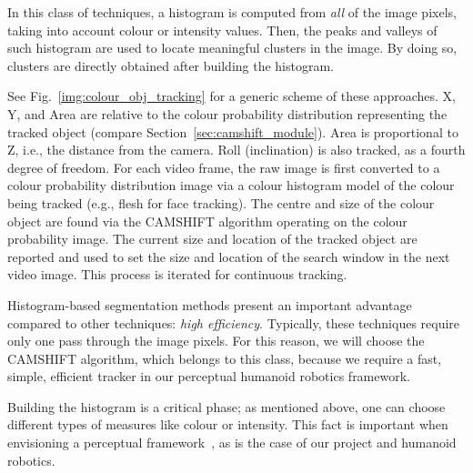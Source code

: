 In this class of techniques, a histogram is computed from \emph{all} of the image pixels, taking into account colour or intensity values. Then, the peaks and valleys of such histogram are used to locate meaningful clusters in the image. By doing so, clusters are directly obtained after building the histogram.

See Fig.~\ref{img:colour_obj_tracking} for a generic scheme of these approaches. X, Y, and Area are relative to the colour probability distribution representing the tracked object (compare Section~\ref{sec:camshift_module}). Area is proportional to Z, i.e., the distance from the camera. Roll (inclination) is also tracked, as a fourth degree of freedom. For each video frame, the raw image is first converted to a colour probability distribution image via a colour histogram model of the colour being tracked (e.g., flesh for face tracking). The centre and size of the colour object are found via the \ac{CAMSHIFT} algorithm operating on the colour probability image. The current size and location of the tracked object are reported and used to set the size and location of the search window in the next video image. This process is iterated for continuous tracking.

Histogram-based segmentation methods present an important advantage compared to other techniques: \emph{high efficiency}. Typically, these techniques require only one pass through the image pixels. For this reason, we will choose the \ac{CAMSHIFT}  algorithm, which belongs to this class, because we require a fast, simple, efficient tracker in our perceptual humanoid robotics framework.

Building the histogram is a critical phase; as mentioned above, one can choose different types of measures like colour or intensity. This fact is important when envisioning a perceptual framework~\cite{bradski:1998}, as is the case of our project and humanoid robotics.

